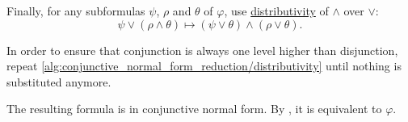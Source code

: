 \begin{algorithm}
\begin{AlgEnum}
     Finally, for any subformulas \( \psi \), \( \rho \) and \( \theta \) of \( \varphi \), use \hyperref[eq:def:distributive_lattice/distributivity]{distributivity} of \( \wedge \) over \( \vee \):
    \begin{equation*}
      \psi \vee (\rho \wedge \theta) \mapsto (\psi \vee \theta) \wedge (\rho \vee \theta).
    \end{equation*}

    In order to ensure that conjunction is always one level higher than disjunction, repeat \ref{alg:conjunctive_normal_form_reduction/distributivity} until nothing is substituted anymore.
  \end{AlgEnum}

  The resulting formula is in conjunctive normal form. By , it is equivalent to \( \varphi \).
\end{algorithm}
